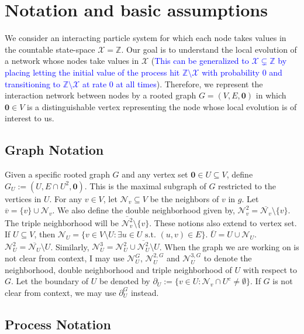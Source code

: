 \documentclass[12pt]{article}
\newcommand{\mb}{\mathbb}
\newcommand{\mc}{\mathcal}
\newcommand{\ov}{\overline}
\newcommand{\te}{\text}
\newcommand{\tb}{\textcolor{blue}}
\newcommand{\defeq}{:=}								%
\newcommand{\sta}{\mc{X}}							%
\newcommand{\neigh}[1]{\mc{N}_{#1}}					%
\newcommand{\dneigh}[1]{\mc{N}^2_{#1}}				%
\newcommand{\tneigh}[1]{\mc{N}^3_{#1}}				%
\newcommand{\gneigh}[2]{\mc{N}^{#1}_{#2}}			%
\newcommand{\dgneigh}[2]{\mc{N}^{2,#1}_{#2}}		%
\newcommand{\tgneigh}[2]{\mc{N}^{3,#1}_{#2}}		%
\newcommand{\bdry}[1]{\partial_{#1}}				%
\newcommand{\gbdry}[2]{\partial^{#1}_{#2}}			%
\newcommand{\cl}[1]{\ov{#1}}						%
\renewcommand{\root}{\mathbf{0}}					%
\newcommand{\subg}[1]{_{#1}}						%
\begin{document}
\section{Notation and basic assumptions}
\label{not}

We consider an interacting particle system for which each node takes values in the countable state-space \(\sta = \mb{Z}\). Our goal is to understand the local evolution of a network whose nodes take values in \(\sta\) (\tb{This can be generalized to \(\sta \subsetneq \mb{Z}\) by placing letting the initial value of the process hit \(\mb{Z}\setminus \sta\) with probability 0 and transitioning to \(\mb{Z}\setminus \sta\) at rate 0 at all times}). Therefore, we represent the interaction network between nodes by a rooted graph \(G = (V,E,\root)\) in which \(\root \in V\) is a distinguishable vertex representing the node whose local evolution is of interest to us.

\subsection{Graph Notation}
\label{not::g}

Given a specific rooted graph \(G\) and any vertex set \(\root \in U \subseteq V\), define \(G\subg{U} \defeq (U,E\cap U^2,\root)\). This is the maximal subgraph of \(G\) restricted to the vertices in \(U\). For any \(v \in V\), let \(\neigh{v}\subseteq V\) be the neighbors of \(v\) in \(g\). Let \(\cl{v} = \{v\}\cup\neigh{v}\). We also define the double neighborhood given by, \(\dneigh{v} = \cl{\neigh{v}}\setminus \{v\}\). The triple neighborhood will be \(\cl{\dneigh{v}} \setminus \{v\}\). These notions also extend to vertex set. If \(U\subseteq V\), then \(\neigh{U} = \{v \in V\setminus U: \exists u \in U\te{ s.t. } (u,v) \in E\}\). \(\cl{U} = U\cup \neigh{U}\). \(\dneigh{U} = \cl{\neigh{U}}\setminus U\). Similarly, \(\tneigh{U} = \dneigh{U} \cup \cl{\dneigh{U}}\setminus U\). When the graph we are working on is not clear from context, I may use \(\gneigh{G}{U}\), \(\dgneigh{G}{U}\) and \(\tgneigh{G}{U}\) to denote the neighborhood, double neighborhood and triple neighborhood of \(U\) with respect to \(G\). Let the boundary of \(U\) be denoted by \(\bdry{U} \defeq \{v \in U: \neigh{v}\cap U^c \neq \emptyset\}\). If \(G\) is not clear from context, we may use \(\gbdry{G}{U}\) instead.

\subsection{Process Notation}
\label{not::p}
\end{document}
